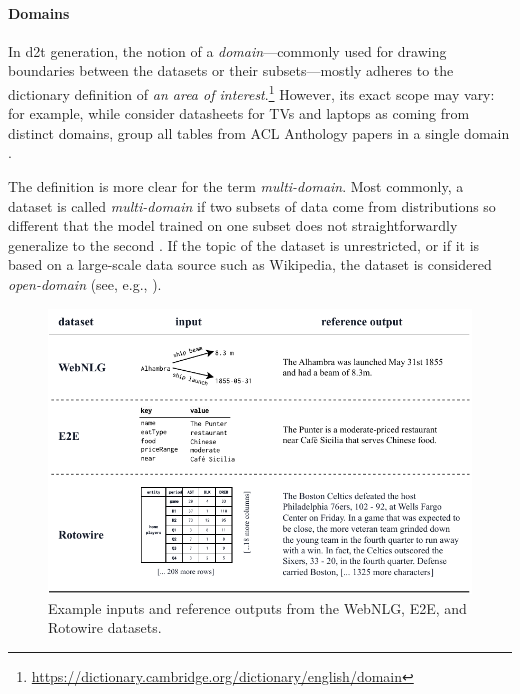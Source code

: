 {\paragraph{Domains} In \ac{d2t} generation, the notion of a \emph{domain}---commonly used for drawing boundaries between the datasets or their subsets---mostly adheres to the dictionary definition of \emph{an area of interest}.\footnote{\url{https://dictionary.cambridge.org/dictionary/english/domain}} However, its exact scope may vary: for example, while \citet{wen2016multi} consider datasheets for TVs and laptops as coming from distinct domains, \citet{lin2023survey} group all tables from ACL Anthology papers in a single domain \cite{suadaaTabletoTextGenerationNumerical2021}.

The definition is more clear for the term \emph{multi-domain}. Most commonly, a dataset is called \emph{multi-domain} if two subsets of data come from distributions so different that the model trained on one subset does not straightforwardly generalize to the second \cite{vanderleeCACAPODatasetMultilingual2020,budzianowskiMultiWOZLargeScaleMultiDomain2020,rastogiScalableMultiDomainConversational2020}. If the topic of the dataset is unrestricted, or if it is based on a large-scale data source such as Wikipedia, the dataset is considered \emph{open-domain} (see, e.g., \citealp{chenLogicalNaturalLanguage2020,nan2021dart,kann2022open}).

\begin{figure}[ht]
    \centering
    \includegraphics[width=\textwidth]{img/datasets.pdf}
    \caption[Examples from WebNLG, E2E, and Rotowire.]{Example inputs and reference outputs from the WebNLG, E2E, and Rotowire datasets.}\label{fig:datasets}
\end{figure}

}
